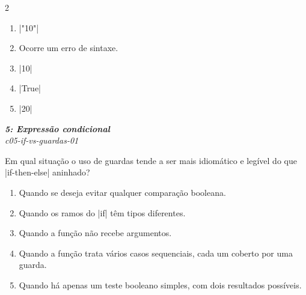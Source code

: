 \documentclass[a4paper,10pt,brazil]{article}
\begin{document}
\begin{multicols}{2}
\begin{enumerate}
  \item \haskellinline|"10"|

  \item Ocorre um erro de sintaxe.

  \item \haskellinline|10|

  \item \haskellinline|True|

  \item \haskellinline|20|


\end{enumerate}

\begin{flushright}
  \footnotesize
  \textit{\textbf{5: Expressão condicional}}\\
  \textit{c05-if-vs-guardas-01}\\

\end{flushright}
Em qual situação o uso de guardas tende a ser mais idiomático e legível do que \haskellinline|if-then-else| aninhado?

\begin{enumerate}
  \item Quando se deseja evitar qualquer comparação booleana.

  \item Quando os ramos do \haskellinline|if| têm tipos diferentes.

  \item Quando a função não recebe argumentos.

  \item Quando a função trata vários casos sequenciais, cada um coberto por uma guarda.

  \item Quando há apenas um teste booleano simples, com dois resultados possíveis.


\end{enumerate}


\end{multicols}
\end{document}
